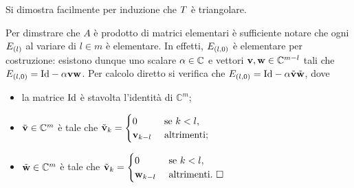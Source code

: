 \Proof Si dimostra facilmente per induzione che $T$ \`e triangolare.
\par Per dimstrare che $A$ \`e prodotto di matrici elementari \`e sufficiente notare che
ogni $E_{(l)}$ al variare di $l \in m$ \`e elementare. In effetti,
$E_{(l,0)}$ \`e elementare per costruzione: esistono dunque uno scalare
$\alpha \in \mathbb{C}$ e vettori $\mathbf{v},\mathbf{w} \in \mathbb{C}^{m - l}$  tali che
$\ElementaryMatrix_{(l,0)} = \Identity - \Scalar\Vector\VarVector$.
Per calcolo diretto si verifica che
$\ElementaryMatrix_{(l,0)} = \Identity - \Scalar\tilde{\Vector}\tilde{\VarVector}$, dove
\begin{itemize}
  \item la matrice $\Identity$ \`e stavolta l'identit\`a di $\mathbb{C}^m$;
  \item $\tilde{\mathbf{v}} \in \mathbb{C}^m$ \`e tale che
    $\tilde{\mathbf{v}}_k =
    \begin{cases}
      0&\text{ se }k < l,\\
      \mathbf{v}_{k - l}&\text{ altrimenti};
    \end{cases}$
  \item $\tilde{\mathbf{w}} \in \mathbb{C}^m$ \`e tale che
    $\tilde{\mathbf{v}}_k =
    \begin{cases}
      0&\text{ se }k < l,\\
      \mathbf{w}_{k - l}&\text{ altrimenti}.\text{ $\square$}
    \end{cases}$
\end{itemize}
